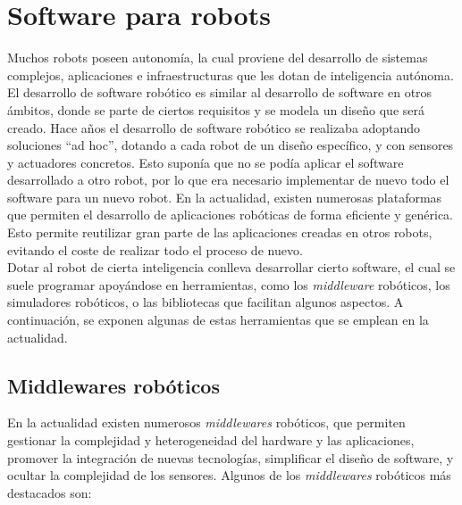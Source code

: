 \section{Software para robots}
Muchos robots poseen autonomía, la cual proviene del desarrollo de sistemas complejos, aplicaciones e infraestructuras que les dotan de inteligencia autónoma. El desarrollo de software robótico es similar al desarrollo de software en otros ámbitos, donde se parte de ciertos requisitos y se modela un diseño que será creado. Hace años el desarrollo de software robótico se realizaba adoptando soluciones ``ad hoc'', dotando a cada robot de un diseño específico, y con sensores y actuadores concretos. Esto suponía que no se podía aplicar el software desarrollado a otro robot, por lo que era necesario implementar de nuevo todo el software para un nuevo robot. En la actualidad, existen numerosas plataformas que permiten el desarrollo de aplicaciones robóticas de forma eficiente y genérica. Esto permite reutilizar gran parte de las aplicaciones creadas en otros robots, evitando el coste de realizar todo el proceso de nuevo.\\

Dotar al robot de cierta inteligencia conlleva desarrollar cierto software, el cual se suele programar apoyándose en herramientas, como los \textit{middleware} robóticos, los simuladores robóticos, o las  bibliotecas que facilitan algunos aspectos. A continuación, se exponen algunas de estas herramientas que se emplean en la actualidad.

\subsection{Middlewares robóticos}
En la actualidad existen numerosos \textit{middlewares} robóticos, que permiten gestionar la complejidad y heterogeneidad del hardware y las aplicaciones, promover la integración de nuevas tecnologías, simplificar el diseño de software, y ocultar la complejidad de los sensores. Algunos de los \textit{middlewares} robóticos más destacados son:

